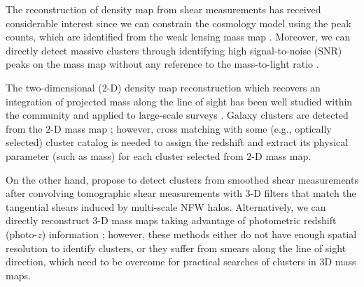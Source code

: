 \documentclass[twocolumn]{aastex63}
\begin{document}

The reconstruction of density map from shear measurements has received
considerable interest since
we can constrain the cosmology model using the peak counts, which are
identified from the weak lensing mass map
\citep{WL-massMap-peakcounts-Jain2000,WL-massMap-peakcountsAna-Fan2010,WL-massMap-peakcountsFM-Lin2016}.
Moreover, we can directly detect massive clusters through
identifying high signal-to-noise (SNR) peaks on the mass map without any
reference to the mass-to-light ratio
\citep{WL-massMap-clusDet-Schneider1996,WL-massMap-clusDet-Hamana2004}.

The two-dimensional ($2$-D) density map reconstruction which recovers an
integration of projected mass along the line of sight has been well studied
within the community
\citep{massMap-KS1993,WL-massMap-Glimpse2D-Lanusse2016,sparseBaysianMassMap-Price2020}
and applied to large-scale surveys
\citep{HSC1-massMaps,massMapDES-Chang2018,DES-SV-massMap-sparsity}.
Galaxy clusters are detected from the $2$-D mass map
\citep{WL-massMap-clusDet-CFHT-Shan2012,WL-massMap-clusDet-HSC-Miyazaki2018,WL-massMap-clusDet-HSC-Hamana2020};
however, cross matching with some (e.g., optically selected) cluster
catalog is needed to assign the redshift and extract its physical parameter
(such as mass) for each cluster selected from $2$-D mass map.

On the other hand, \citet{WL-clusDet-Hennawi2005} propose to detect clusters
from smoothed shear measurements after convolving tomographic shear
measurements with $3$-D filters that match the tangential shears induced by
multi-scale NFW halos.
Alternatively, we can directly reconstruct $3$-D mass maps taking advantage of
photometric redshift (photo-$z$) information
\citep{LSS-massMap-Wiener-Simon2009,WL-massMap-VanderPlas2011}; however, these
methods either do not have enough spatial resolution to identify clusters, or
they suffer from smears along the line of sight direction, which need to be
overcome for practical searches of clusters in 3D mass maps.
\end{document}
